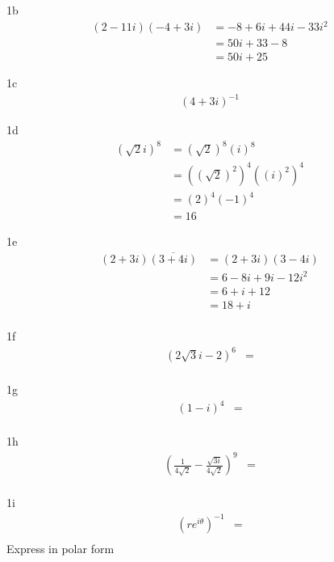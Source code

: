 \begin{question}{1b}
\begin{align*}
(2-11i)(-4+3i) 
&= -8 + 6i + 44i - 33i^2\\ 
&= 50i + 33 -8 \\
&= 50i +25 
\end{align*}
\end{question}
\begin{question}{1c}
\begin{align*}
(4+3i)^{-1}
\end{align*}
\end{question}
\begin{question}{1d}
\begin{align*}
(\sqrt{2}i)^{8}
 &= (\sqrt{2})^8(i)^8\\ 
 &= ((\sqrt{2})^2)^4((i)^2)^4\\ 
 &= (2)^4(-1)^4\\ 
 &= 16
\end{align*}
\end{question}
\begin{question}{1e}
\begin{align*}
(2+3i)\overline{(3+4i)}
 &= (2+3i)(3-4i)\\ 
 &= 6-8i+9i-12i^2\\ 
 &= 6+i+12\\ 
 &= 18+i\\ 
\end{align*}
\end{question}
\begin{question}{1f}
\begin{align*}
(2\sqrt{3}i-2)^{6}
 &= \\ 
\end{align*}
\end{question}
\begin{question}{1g}
\begin{align*}
(1-i)^{4}
 &= \\ 
\end{align*}
\end{question}
\begin{question}{1h}
\begin{align*}
(\frac{1}{4\sqrt{2}} - \frac{\sqrt{3i}}{4\sqrt{2}})^{9}
 &= \\ 
\end{align*}
\end{question}
\begin{question}{1i}
\begin{align*}
(re^{i\theta})^{-1}
 &= \\ 
\end{align*} 
Express in polar form
\end{question}
